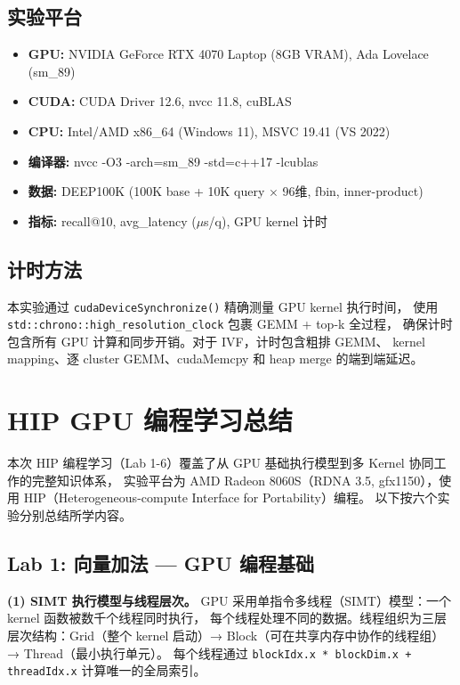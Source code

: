 \documentclass[UTF8,a4paper,10pt]{ctexart}
\begin{document}
\subsection{实验平台}

\begin{itemize}[itemsep=0pt]
\item \textbf{GPU:} NVIDIA GeForce RTX 4070 Laptop (8GB VRAM), Ada Lovelace (sm\_89)
\item \textbf{CUDA:} CUDA Driver 12.6, nvcc 11.8, cuBLAS
\item \textbf{CPU:} Intel/AMD x86\_64 (Windows 11), MSVC 19.41 (VS 2022)
\item \textbf{编译器:} nvcc -O3 -arch=sm\_89 -std=c++17 -lcublas
\item \textbf{数据:} DEEP100K (100K base + 10K query $\times$ 96维, fbin, inner-product)
\item \textbf{指标:} recall@10, avg\_latency ($\mu$s/q), GPU kernel 计时
\end{itemize}

\subsection{计时方法}

本实验通过 \texttt{cudaDeviceSynchronize()} 精确测量 GPU kernel 执行时间，
使用 \texttt{std::chrono::high\_resolution\_clock} 包裹 GEMM + top-k 全过程，
确保计时包含所有 GPU 计算和同步开销。对于 IVF，计时包含粗排 GEMM、
kernel mapping、逐 cluster GEMM、cudaMemcpy 和 heap merge 的端到端延迟。

\section{HIP GPU 编程学习总结}

本次 HIP 编程学习（Lab 1-6）覆盖了从 GPU 基础执行模型到多 Kernel 协同工作的完整知识体系，
实验平台为 AMD Radeon 8060S（RDNA 3.5, gfx1150），使用 HIP（Heterogeneous-compute Interface for Portability）编程。
以下按六个实验分别总结所学内容。

\subsection{Lab 1: 向量加法 — GPU 编程基础}

\textbf{(1) SIMT 执行模型与线程层次。}
GPU 采用单指令多线程（SIMT）模型：一个 kernel 函数被数千个线程同时执行，
每个线程处理不同的数据。线程组织为三层层次结构：Grid（整个 kernel 启动）→
Block（可在共享内存中协作的线程组）→ Thread（最小执行单元）。
每个线程通过 \texttt{blockIdx.x * blockDim.x + threadIdx.x} 计算唯一的全局索引。
\end{document}
